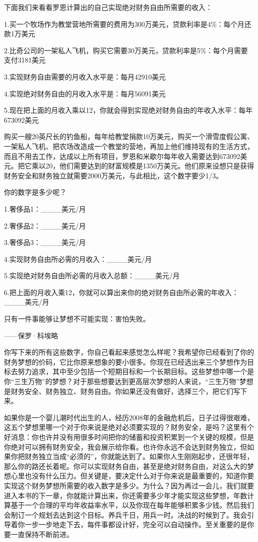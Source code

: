 下面我们来看看罗恩计算出的自己实现绝对财务自由所需要的收入：

1.买一个牧场作为教堂营地所需要的费用为300万美元，贷款利率是4\%：每个月还款1万美元

2.比奇公司的一架私人飞机，购买它需要30万美元，贷款利率是5\%：每个月需要支付3181美元

3.实现财务自由需要的月收入水平是：每月42910美元

4.实现绝对财务自由的月收入水平是：每月56091美元

5.现在把上面的月收入乘以12，你就会得到实现绝对财务自由的年收入水平：每年673092美元

购买一艘20英尺长的钓鱼船，每年给教堂捐款10万美元，购买一个滑雪度假公寓、一架私人飞机、把农场改造成一个教堂的营地，再加上他们维持现有的生活方式，而且不用去工作，达成以上所有项目，罗恩和米歇尔每年收入需要达到673092美元。把它乘以20，他们需要达到的财富规模是1350万美元。他们原来设想只是获得财务安全和财务独立就需要2000万美元，与此相比，这个数字要少1/3。

你的数字是多少呢？

1.奢侈品1：\_\_\_\_美元/月

2.奢侈品2：\_\_\_\_美元/月

3.奢侈品3：\_\_\_\_美元/月

4.实现财务自由所必需的月收入：\_\_\_\_美元/月

5.实现绝对财务自由所必需的月收入总额：\_\_\_\_美元/月

6.把上面的月收入乘12，你就可以算出来你的绝对财务自由所必需的年收入：\_\_\_\_美元/月

\begin{BookQuote}
只有一件事能够让梦想不可能实现：害怕失败。

\hfill ——保罗·科埃略
\end{BookQuote}

你写下来的所有这些数字，你自己看起来感觉怎么样呢？我希望你已经看到了你的财务梦想的价码，它比你原来想象的要小很多。你现在已经选出来三个梦想作为目标去努力追求，其中至少包括一个短期目标和一个长期目标。这些梦想中哪一个是你“三生万物”的梦想？对于那些想要达到更高层次梦想的人来说，“三生万物”梦想是财务安全、财务独立、财务自由。你如果还没有做好，选择三个，把它们写下来。

如果你是一个婴儿潮时代出生的人，经历2008年的金融危机后，日子过得很艰难，这五个梦想里哪一个对于你来说是绝对必须要实现的？财务安全，是吗？这里有个好消息：你也许并没有用很多时间把你的储蓄和投资积累到一个关键的规模，但是你绝对可以拥有财务安全，我会展示给你看。也许你永远不会达到财务独立，但如果你把财务独立当成“必须的”，你就能达到了。如果你人生刚刚起步，还很年轻，那么你的路还长着呢。你可以实现财务自由，甚至是绝对财务自由，对这么大的梦想心里也没有什么压力。但关键是，要决定什么对于你来说是最重要的，知道你要实现这个财务梦想所需要的收入数字是多少。为什么？因为再过一会儿，我们就要进入本书的下一章，你就能计算出来，你还需要多少年才能实现这些梦想，年数计算基于一个合理的平均年收益率水平，以及你现在每年能够积累多少钱。然后我们会制订一个规划去达到这个目标。养兵千日，用兵一时。决战的时候到了。我会引导着你一步一步地走下去，每件事都设计好，完全可以自动操作。至关重要的是你要一直保持不断前进。

